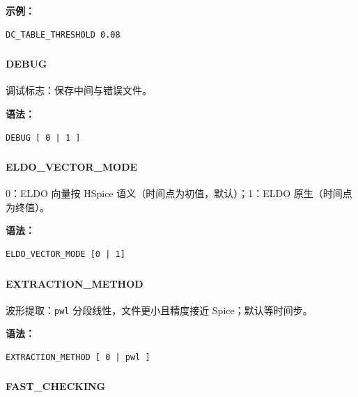\textbf{示例：}
\begin{lstlisting}
DC_TABLE_THRESHOLD 0.08
\end{lstlisting}

\subsubsection{}
\paragraph*{DEBUG}

调试标志：保存中间与错误文件。

\textbf{语法：}
\begin{lstlisting}
DEBUG [ 0 | 1 ]
\end{lstlisting}

\subsubsection{}
\paragraph*{ELDO_VECTOR_MODE}

0：ELDO 向量按 HSpice 语义（时间点为初值，默认）；1：ELDO 原生（时间点为终值）。

\textbf{语法：}
\begin{lstlisting}
ELDO_VECTOR_MODE [0 | 1]
\end{lstlisting}

\subsubsection{}
\paragraph*{EXTRACTION_METHOD}

波形提取：\texttt{pwl} 分段线性，文件更小且精度接近 Spice；默认等时间步。

\textbf{语法：}
\begin{lstlisting}
EXTRACTION_METHOD [ 0 | pwl ]
\end{lstlisting}

\subsubsection{}
\paragraph*{FAST_CHECKING}

